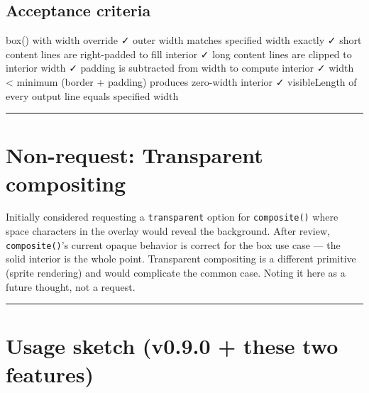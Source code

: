 \subsection{Acceptance criteria}\label{record-016-acceptance-criteria-1}

\begin{CodeBlock}
box() with width override
  ✓ outer width matches specified width exactly
  ✓ short content lines are right-padded to fill interior
  ✓ long content lines are clipped to interior width
  ✓ padding is subtracted from width to compute interior
  ✓ width < minimum (border + padding) produces zero-width interior
  ✓ visibleLength of every output line equals specified width
\end{CodeBlock}

\begin{center}\rule{0.5\linewidth}{0.5pt}\end{center}

\section{Non-request: Transparent compositing}\label{record-016-non-request-transparent-compositing}

Initially considered requesting a \texttt{t\allowbreak{}r\allowbreak{}a\allowbreak{}n\allowbreak{}s\allowbreak{}p\allowbreak{}a\allowbreak{}r\allowbreak{}e\allowbreak{}n\allowbreak{}t} option for \texttt{c\allowbreak{}o\allowbreak{}m\allowbreak{}p\allowbreak{}o\allowbreak{}s\allowbreak{}i\allowbreak{}t\allowbreak{}e\allowbreak{}(\allowbreak{})} where space characters in the overlay would reveal the background. After review, \texttt{c\allowbreak{}o\allowbreak{}m\allowbreak{}p\allowbreak{}o\allowbreak{}s\allowbreak{}i\allowbreak{}t\allowbreak{}e\allowbreak{}(\allowbreak{})}'s current opaque behavior is correct for the box use case --- the solid interior is the whole point. Transparent compositing is a different primitive (sprite rendering) and would complicate the common case. Noting it here as a future thought, not a request.

\begin{center}\rule{0.5\linewidth}{0.5pt}\end{center}

\section{Usage sketch (v0.9.0 + these two features)}\label{record-016-usage-sketch-v0.9.0-these-two-features}

